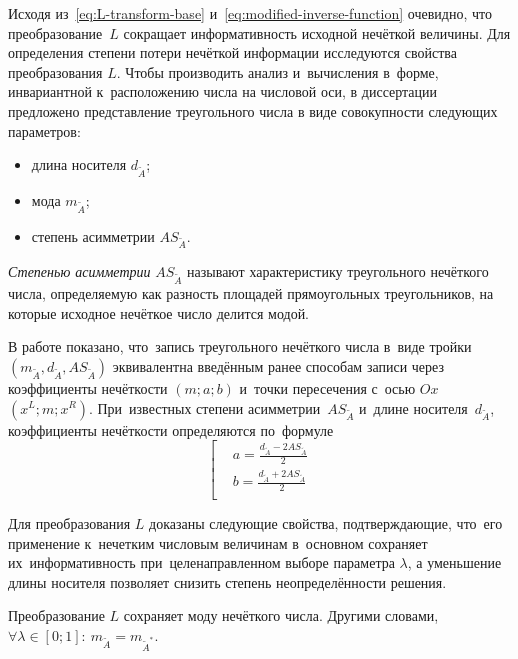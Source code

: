 Исходя из~\eqref{eq:L-transform-base} и~\eqref{eq:modified-inverse-function} очевидно, что преобразование~$L$ сокращает информативность исходной нечёткой величины. Для определения степени потери нечёткой информации исследуются свойства преобразования $L$. Чтобы производить анализ и~вычисления в~форме, инвариантной к~расположению числа на числовой оси, в диссертации предложено представление треугольного числа в виде совокупности следующих параметров:
\begin{itemize}
  \item длина носителя $d_{\tilde A}$;
  \item мода $m_{\tilde A}$;
  \item степень асимметрии $AS_{\tilde A}$.
\end{itemize}

\textit{Степенью асимметрии} $AS_{\tilde A}$ называют характеристику треугольного нечёткого числа, определяемую как разность площадей прямоугольных треугольников, на которые исходное нечёткое число делится модой.

В работе показано, что~запись треугольного нечёткого числа в~виде тройки $\left(m_{\tilde A}, d_{\tilde A}, AS_{\tilde A} \right)$ эквивалентна введённым ранее способам записи через коэффициенты нечёткости $\left( m;a;b \right)$ и~точки пересечения с~осью $Ox$ $\left( x^L;m;x^R \right)$. При~известных степени асимметрии~$AS_{\tilde A}$ и~длине носителя~$d_{\tilde A}$, коэффициенты нечёткости определяются по~формуле
\begin{equation*}
	\left[ \begin{aligned}
      & a=\frac{d_{\tilde A}-2AS_{\tilde A}}{2} \\ 
      & b=\frac{d_{\tilde A}+2AS_{\tilde A}}{2} \\ 
    \end{aligned} \right.
\end{equation*}

Для преобразования $L$ доказаны следующие свойства, подтверждающие, что~его применение к~нечетким числовым величинам в~основном сохраняет их~информативность при~целенаправленном выборе параметра $\lambda$, а уменьшение длины носителя позволяет снизить степень неопределённости решения.

\begin{prop}
\label{prop:L-prop1}
Преобразование $L$ сохраняет моду нечёткого числа. Другими словами, $\forall \lambda \in \left[ 0;1 \right]:\ m_{\tilde A}=m_{\tilde A^{*}}$.
\end{prop}

